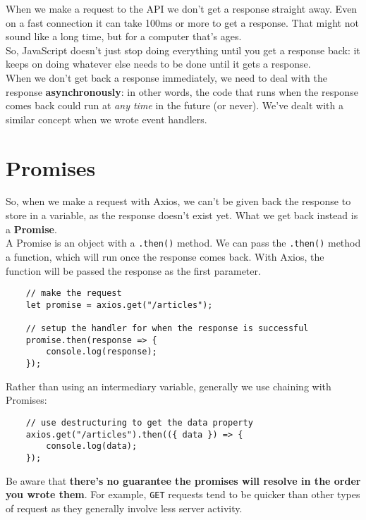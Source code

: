 When we make a request to the API we don't get a response straight away. Even on a fast connection it can take 100ms or more to get a response. That might not sound like a long time, but for a computer that's ages.
\\

So, JavaScript doesn't just stop doing everything until you get a response back: it keeps on doing whatever else needs to be done until it gets a response.
\\

When we don't get back a response immediately, we need to deal with the response \textbf{asynchronously}: in other words, the code that runs when the response comes back could run at \textit{any time} in the future (or never).  We've dealt with a similar concept when we wrote event handlers.


\section{Promises}

So, when we make a request with Axios, we can't be given back the response to store in a variable, as the response doesn't exist yet. What we get back instead is a \textbf{Promise}.
\\

A Promise is an object with a \texttt{.then()} method. We can pass the \texttt{.then()} method a function, which will run once the response comes back. With Axios, the function will be passed the response as the first parameter.

\begin{verbatim}
    // make the request
    let promise = axios.get("/articles");

    // setup the handler for when the response is successful
    promise.then(response => {
        console.log(response);
    });
\end{verbatim}

Rather than using an intermediary variable, generally we use chaining with Promises:

\begin{verbatim}
    // use destructuring to get the data property
    axios.get("/articles").then(({ data }) => {
        console.log(data);
    });
\end{verbatim}

Be aware that \textbf{there's no guarantee the promises will resolve in the order you wrote them}. For example, \texttt{GET} requests tend to be quicker than other types of request as they generally involve less server activity.


